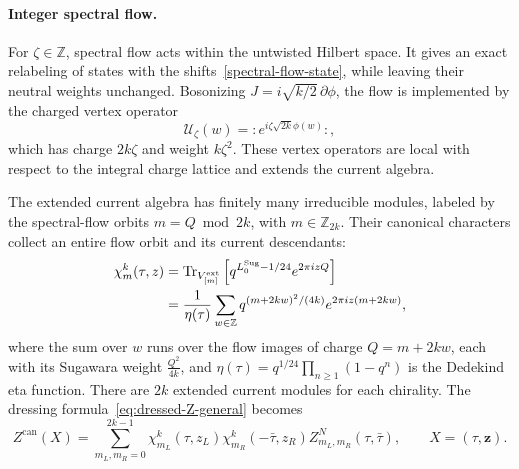 \documentclass[11pt]{article}
\numberwithin{equation}{section}
\begin{document}
\paragraph{Integer spectral flow.}
For $\zeta\in\mathbb Z$, spectral flow acts within the untwisted Hilbert space. It gives an exact relabeling of states with the shifts~\eqref{spectral-flow-state}, while leaving their neutral weights unchanged. Bosonizing $J=i\sqrt{k/2}\,\partial\phi$, the flow is implemented by the charged vertex operator
\begin{equation}
\mathcal U_\zeta(w)=:e^{i\zeta\sqrt{2k}\phi(w)}:,
\label{equ:SF_vertex_opt}
\end{equation}
which has charge $2k\zeta$ and weight $k\zeta^2$. These vertex operators are local with respect to the integral charge lattice and extends the current algebra.

The extended current algebra has finitely many irreducible modules, labeled by the spectral-flow orbits $m=Q\bmod 2k$, with $m\in\mathbb Z_{2k}$. Their canonical characters collect an entire flow orbit and its current descendants:
\begin{align}
\begin{split}
\chi_m^k(\tau,z)
&=\operatorname{Tr}_{V_{[m]}^{\mathrm{ext}}}
 \left[q^{L_0^{\mathrm{Sug}}-1/24}e^{2\pi izQ}\right]\\
&=\frac1{\eta(\tau)}\sum_{w\in\mathbb Z}
 q^{(m+2kw)^2/(4k)}e^{2\pi iz(m+2kw)},
\label{2k-theta_function}
\end{split}
\end{align}
where the sum over $w$ runs over the flow images of charge $Q=m+2kw$, each with its Sugawara weight $\frac{Q^2}{4k}$, and $\eta(\tau)=q^{1/24}\prod_{n\ge1}(1-q^n)$ is the Dedekind eta function. There are $2k$ extended current modules for each chirality. The dressing formula~\eqref{eq:dressed-Z-general} becomes
\begin{equation}
Z^{\mathrm{can}}(X)
 =\sum_{m_L,m_R=0}^{2k-1}
 \chi_{m_L}^k(\tau,z_L)\chi_{m_R}^k(-\bar\tau,z_R)
 Z^N_{m_L,m_R}(\tau,\bar\tau),
 \qquad X=(\tau,\mathbf z).
\label{eq:U1-dressing}
\end{equation}
\end{document}
